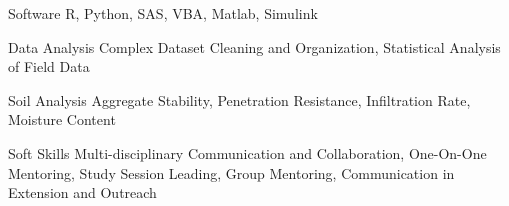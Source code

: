 

\begin{cvskills}

  \cvskill
    {Software } %
    {R, Python, SAS, VBA, Matlab, Simulink} %

\cvskill
    {Data Analysis} %
    {Complex Dataset Cleaning and Organization, Statistical Analysis of Field Data} %
    
\cvskill
    {Soil Analysis} %
    {Aggregate Stability, Penetration Resistance, Infiltration Rate, Moisture Content} %
    
\cvskill
    {Soft Skills} %
    {Multi-disciplinary Communication and Collaboration, One-On-One Mentoring, Study Session Leading, Group Mentoring, Communication in Extension and Outreach} %


\end{cvskills}

